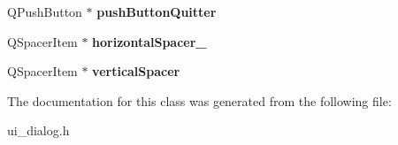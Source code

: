 \begin{DoxyCompactItemize}
\item 
\hypertarget{classUi__Dialog_a78ee6ada2fdeb1c65eb41a8bffc88779}{Q\-Push\-Button $\ast$ {\bfseries push\-Button\-Quitter}}\label{classUi__Dialog_a78ee6ada2fdeb1c65eb41a8bffc88779}

\item 
\hypertarget{classUi__Dialog_aeef14ab9a700a60a517ec304400104e5}{Q\-Spacer\-Item $\ast$ {\bfseries horizontal\-Spacer\-\_}}\label{classUi__Dialog_aeef14ab9a700a60a517ec304400104e5}

\item 
\hypertarget{classUi__Dialog_a5272f4a31affb22b7118cd47e5a96002}{Q\-Spacer\-Item $\ast$ {\bfseries vertical\-Spacer}}\label{classUi__Dialog_a5272f4a31affb22b7118cd47e5a96002}

\end{DoxyCompactItemize}


The documentation for this class was generated from the following file\-:\begin{DoxyCompactItemize}
\item 
ui\-\_\-dialog.\-h\end{DoxyCompactItemize}
